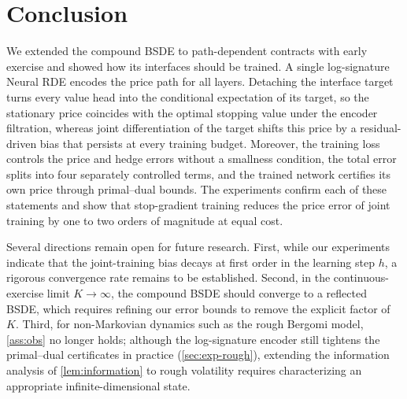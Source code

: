 \FloatBarrier
\section{Conclusion}\label{sec:conclusion}

We extended the compound BSDE to path-dependent contracts with early exercise and showed how its interfaces should be trained. A single log-signature Neural RDE encodes the price path for all layers. Detaching the interface target turns every value head into the conditional expectation of its target, so the stationary price coincides with the optimal stopping value under the encoder filtration, whereas joint differentiation of the target shifts this price by a residual-driven bias that persists at every training budget. Moreover, the training loss controls the price and hedge errors without a smallness condition, the total error splits into four separately controlled terms, and the trained network certifies its own price through primal--dual bounds. The experiments confirm each of these statements and show that stop-gradient training reduces the price error of joint training by one to two orders of magnitude at equal cost.

Several directions remain open for future research. First, while our experiments indicate that the joint-training bias decays at first order in the learning step $h$, a rigorous convergence rate remains to be established. Second, in the continuous-exercise limit $K\to\infty$, the compound BSDE should converge to a reflected BSDE, which requires refining our error bounds to remove the explicit factor of $K$. Third, for non-Markovian dynamics such as the rough Bergomi model, \cref{ass:obs} no longer holds; although the log-signature encoder still tightens the primal--dual certificates in practice (\cref{sec:exp-rough}), extending the information analysis of \cref{lem:information} to rough volatility requires characterizing an appropriate infinite-dimensional state.
